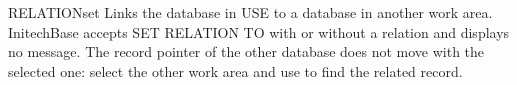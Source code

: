 \begin{XbaseEntry}{RELATION}{set}
Links the database in USE to a database in another work area.
\Syntax
{}
\Usage
InitechBase accepts SET RELATION TO with or without a relation and displays no
message.  The record pointer of the other database does not move with the
selected one: select the other work area and use  to find the related
record.
\end{XbaseEntry}

